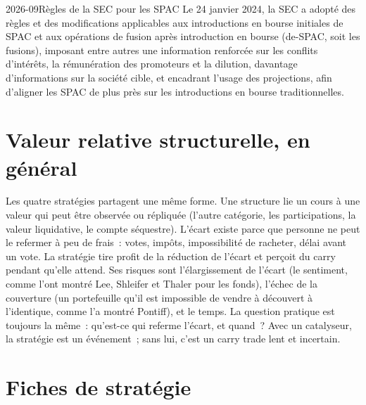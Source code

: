 \begin{dated}{2026-09}{Règles de la SEC pour les SPAC}\label{dat:s1:share-classes-holding-companies-closed-end-funds-spacs:sec}
Le 24 janvier 2024, la SEC a adopté des règles et des modifications applicables aux introductions en bourse initiales de SPAC et aux opérations de fusion après introduction en bourse (de-SPAC, soit les fusions), imposant entre autres
une information renforcée sur les conflits d'intérêts, la rémunération des promoteurs et la dilution, davantage d'informations sur la société cible, et encadrant
l'usage des projections, afin d'aligner les SPAC de plus près sur les introductions en bourse traditionnelles.
\end{dated}

\section{Valeur relative structurelle, en général}

Les quatre stratégies partagent une même forme. Une structure lie un cours à une valeur qui peut être observée ou répliquée (l'autre catégorie, les participations, la valeur liquidative,
le compte séquestre). L'écart existe parce que personne ne peut le refermer à peu de frais~: votes, impôts, impossibilité de racheter, délai avant un vote. La stratégie tire profit de la
réduction de l'écart et perçoit du carry pendant qu'elle attend. Ses risques sont l'élargissement de l'écart (le sentiment, comme l'ont montré Lee, Shleifer et Thaler pour les fonds), l'échec de la couverture (un
portefeuille qu'il est impossible de vendre à découvert à l'identique, comme l'a montré Pontiff), et le temps. La question pratique est toujours la même~: qu'est-ce qui referme l'écart, et quand~? Avec un
catalyseur, la stratégie est un événement~; sans lui, c'est un carry trade lent et incertain.

\section{Fiches de stratégie}


